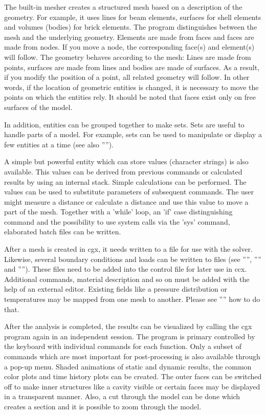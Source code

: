 \documentclass{article}
\begin{document}
The built-in mesher creates a structured mesh based on a description of the geometry. For example, it uses lines for beam elements, surfaces for shell elements and volumes (bodies) for brick elements. The program distinguishes between the mesh and the underlying geometry. Elements are made from faces and faces are made from nodes. If you move a node, the corresponding face(s) and element(s) will follow. The geometry behaves according to the mesh:
Lines are made from points, surfaces are made from lines and bodies are made of surfaces. As a result, if you modify the position of a point, all related geometry will follow. In other words, if the location of geometric entities is changed, it is necessary to move the points on which the entities rely.  It should be noted that faces exist only on free surfaces of the model.

In addition, entities can be grouped together to make sets. Sets are useful to handle parts of a model. For example, sets can be used to manipulate or display a few entities at a time (see also ''''). 

A simple but powerful entity which can store values (character strings) is also available. This values can be derived from previous commands or calculated results by using an internal stack. Simple calculations can be performed. The values can be used to substitute parameters of subsequent commands. The user might measure a distance or calculate a distance and use this value to move a part of the mesh. Together with a 'while' loop, an 'if' case distinguishing command and the possibility to use system calls via the 'sys' command, elaborated batch files can be written.  

After a mesh is created in cgx, it needs written to a file for use with the solver. Likewise, several boundary conditions and loads can be written to files (see '''', '''' and ''''). These files need to be added into the control file for later use in ccx. Additional commands, material description and so on must be added with the help of an external editor. Existing fields like a pressure distribution or temperatures may be mapped from one mesh to another. Please see '''' how to do that.

After the analysis is completed, the results can be visualized by calling the cgx program again in an independent session. The program is primary controlled by the keyboard with individual commands for each function. Only a subset of commands which are most important for post-processing is also available through a pop-up menu. Shaded animations of static and dynamic results, the common color plots and time history plots can be created. The outer faces can be switched off to make inner structures like a cavity visible or certain faces may be displayed in a transparent manner. Also, a cut through the model can be done which creates a section and it is possible to zoom through the model.
\end{document}
